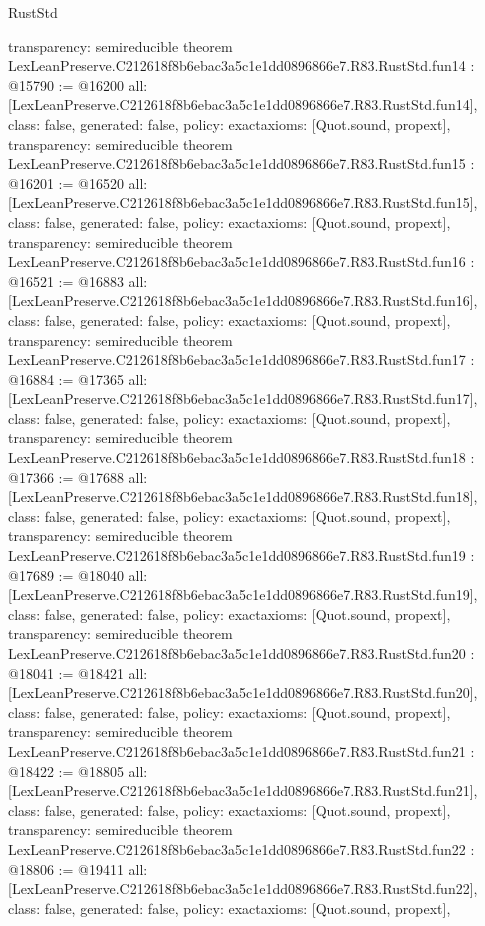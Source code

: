 \begin{lexlean}{RustStd}
\begin{coremodule}
{  transparency: semireducible
}
theorem LexLeanPreserve.C212618f8b6ebac3a5c1e1dd0896866e7.R83.RustStd.fun14 : @15790 := @16200 {
  all: [LexLeanPreserve.C212618f8b6ebac3a5c1e1dd0896866e7.R83.RustStd.fun14],
  class: false,
  generated: false,
  policy: exact{axioms: [Quot.sound, propext]},
  transparency: semireducible
}
theorem LexLeanPreserve.C212618f8b6ebac3a5c1e1dd0896866e7.R83.RustStd.fun15 : @16201 := @16520 {
  all: [LexLeanPreserve.C212618f8b6ebac3a5c1e1dd0896866e7.R83.RustStd.fun15],
  class: false,
  generated: false,
  policy: exact{axioms: [Quot.sound, propext]},
  transparency: semireducible
}
theorem LexLeanPreserve.C212618f8b6ebac3a5c1e1dd0896866e7.R83.RustStd.fun16 : @16521 := @16883 {
  all: [LexLeanPreserve.C212618f8b6ebac3a5c1e1dd0896866e7.R83.RustStd.fun16],
  class: false,
  generated: false,
  policy: exact{axioms: [Quot.sound, propext]},
  transparency: semireducible
}
theorem LexLeanPreserve.C212618f8b6ebac3a5c1e1dd0896866e7.R83.RustStd.fun17 : @16884 := @17365 {
  all: [LexLeanPreserve.C212618f8b6ebac3a5c1e1dd0896866e7.R83.RustStd.fun17],
  class: false,
  generated: false,
  policy: exact{axioms: [Quot.sound, propext]},
  transparency: semireducible
}
theorem LexLeanPreserve.C212618f8b6ebac3a5c1e1dd0896866e7.R83.RustStd.fun18 : @17366 := @17688 {
  all: [LexLeanPreserve.C212618f8b6ebac3a5c1e1dd0896866e7.R83.RustStd.fun18],
  class: false,
  generated: false,
  policy: exact{axioms: [Quot.sound, propext]},
  transparency: semireducible
}
theorem LexLeanPreserve.C212618f8b6ebac3a5c1e1dd0896866e7.R83.RustStd.fun19 : @17689 := @18040 {
  all: [LexLeanPreserve.C212618f8b6ebac3a5c1e1dd0896866e7.R83.RustStd.fun19],
  class: false,
  generated: false,
  policy: exact{axioms: [Quot.sound, propext]},
  transparency: semireducible
}
theorem LexLeanPreserve.C212618f8b6ebac3a5c1e1dd0896866e7.R83.RustStd.fun20 : @18041 := @18421 {
  all: [LexLeanPreserve.C212618f8b6ebac3a5c1e1dd0896866e7.R83.RustStd.fun20],
  class: false,
  generated: false,
  policy: exact{axioms: [Quot.sound, propext]},
  transparency: semireducible
}
theorem LexLeanPreserve.C212618f8b6ebac3a5c1e1dd0896866e7.R83.RustStd.fun21 : @18422 := @18805 {
  all: [LexLeanPreserve.C212618f8b6ebac3a5c1e1dd0896866e7.R83.RustStd.fun21],
  class: false,
  generated: false,
  policy: exact{axioms: [Quot.sound, propext]},
  transparency: semireducible
}
theorem LexLeanPreserve.C212618f8b6ebac3a5c1e1dd0896866e7.R83.RustStd.fun22 : @18806 := @19411 {
  all: [LexLeanPreserve.C212618f8b6ebac3a5c1e1dd0896866e7.R83.RustStd.fun22],
  class: false,
  generated: false,
  policy: exact{axioms: [Quot.sound, propext]},
}
\end{coremodule}
\end{lexlean}
